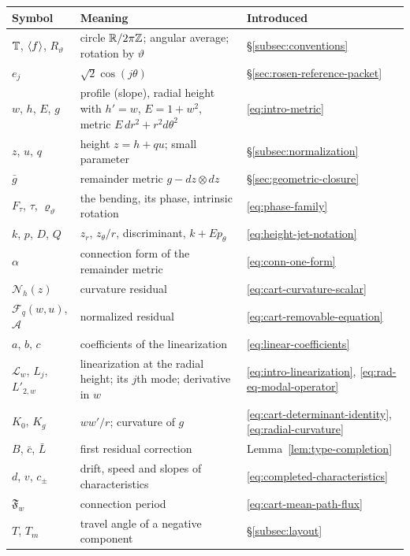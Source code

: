 \begin{longtable}{@{}p{.23\linewidth}p{.52\linewidth}p{.19\linewidth}@{}}
\toprule
Symbol & Meaning & Introduced\\
\midrule
\endhead
$\mathbb T$, $\langle f\rangle$, $R_\vartheta$ & circle $\mathbb R/2\pi\mathbb Z$; angular average;
 rotation by $\vartheta$ & \S\ref{subsec:conventions}\\
$e_j$ & $\sqrt2\cos(j\theta)$ & \S\ref{sec:rosen-reference-packet}\\
$w$, $h$, $E$, $g$ & profile (slope), radial height with $h'=w$,
 $E=1+w^2$, metric $E\,dr^2+r^2d\theta^2$ & \eqref{eq:intro-metric}\\
$z$, $u$, $q$ & height $z=h+qu$; small parameter & \S\ref{subsec:normalization}\\
$\bar g$ & remainder metric $g-dz\otimes dz$ & \S\ref{sec:geometric-closure}\\
$F_\tau$, $\tau$, $\varrho_\vartheta$ & the bending, its phase,
 intrinsic rotation & \eqref{eq:phase-family}\\
$k$, $p$, $D$, $Q$ & $z_r$, $z_\theta/r$, discriminant, $k+Ep_\theta$
 & \eqref{eq:height-jet-notation}\\
$\alpha$ & connection form of the remainder metric & \eqref{eq:conn-one-form}\\
$\mathcal N_h(z)$ & curvature residual & \eqref{eq:cart-curvature-scalar}\\
$\mathcal F_q(w,u)$, $\mathcal A$ & normalized residual
 & \eqref{eq:cart-removable-equation}\\
$a$, $b$, $c$ & coefficients of the linearization
 & \eqref{eq:linear-coefficients}\\
$\mathscr L_w$, $L_j$, $L'_{2,w}$ & linearization at the radial
 height; its $j$th mode; derivative in $w$
 & \eqref{eq:intro-linearization}, \eqref{eq:rad-eq-modal-operator}\\
$K_0$, $K_g$ & $ww'/r$; curvature of $g$
 & \eqref{eq:cart-determinant-identity}, \eqref{eq:radial-curvature}\\
$B$, $\bar c$, $\bar L$ & first residual correction
 & Lemma~\ref{lem:type-completion}\\
$d$, $v$, $c_\pm$ & drift, speed and slopes of characteristics
 & \eqref{eq:completed-characteristics}\\
$\mathfrak F_w$ & connection period & \eqref{eq:cart-mean-path-flux}\\
$T$, $T_m$ & travel angle of a negative component
 & \S\ref{subsec:layout}\\
\bottomrule
\end{longtable}

